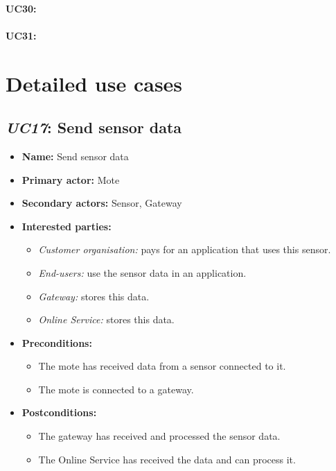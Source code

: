 \paragraph{UC30: }
\paragraph{UC31: }

\section{Detailed use cases}

\subsection{\emph{UC17}: Send sensor data}
\begin{itemize}
    \item \textbf{Name:} Send sensor data
    \item \textbf{Primary actor:} Mote
    \item \textbf{Secondary actors:} Sensor, Gateway
    \item \textbf{Interested parties:}
        \begin{itemize}
            \item \textit{Customer organisation:} pays for an application that uses this sensor.
            \item \textit{End-users:} use the sensor data in an application.
            \item \textit{Gateway:} stores this data.
            \item \textit{Online Service:} stores this data.
        \end{itemize}

    \item \textbf{Preconditions:}
        \begin{itemize}
            \item The mote has received data from a sensor connected to it.
            \item The mote is connected to a gateway.
        \end{itemize}

    \item \textbf{Postconditions:}
        \begin{itemize}
            \item The gateway has received and processed the sensor data.
            \item The Online Service has received the data and can process it.
        \end{itemize}


\end{itemize}
